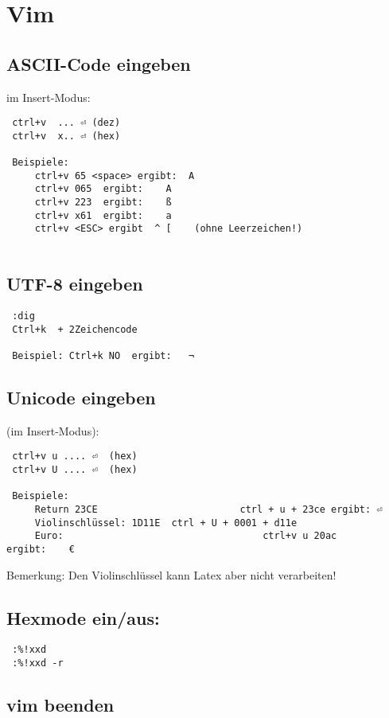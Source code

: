 \section{Vim}



\subsection{ASCII-Code eingeben}
im Insert-Modus:
\begin{verbatim}
 ctrl+v  ... ⏎ (dez)     
 ctrl+v  x.. ⏎ (hex)    
	
 Beispiele: 
	 ctrl+v 65 <space> ergibt:	A
	 ctrl+v 065  ergibt:	A
	 ctrl+v 223  ergibt:	ß
	 ctrl+v x61  ergibt:	a
	 ctrl+v <ESC> ergibt  ^ [    (ohne Leerzeichen!)
		
\end{verbatim}



\subsection{UTF-8 eingeben}
\begin{verbatim}
 :dig			
 Ctrl+k  + 2Zeichencode 
 
 Beispiel: Ctrl+k NO  ergibt:	¬
\end{verbatim}

\subsection{Unicode eingeben}
 (im Insert-Modus):
\begin{verbatim}
 ctrl+v u .... ⏎  (hex)   
 ctrl+v U .... ⏎  (hex)   

 Beispiele:
	 Return 23CE						 ctrl + u + 23ce ergibt: ⏎
	 Violinschlüssel: 1D11E  ctrl + U + 0001 + d11e  
	 Euro:									 ctrl+v u 20ac		 ergibt:	€

\end{verbatim}
Bemerkung:  Den Violinschlüssel  %
kann Latex aber nicht verarbeiten!

\subsection{Hexmode ein/aus:}
\begin{verbatim}
 :%!xxd
 :%!xxd -r
\end{verbatim}

\subsection{vim beenden}

